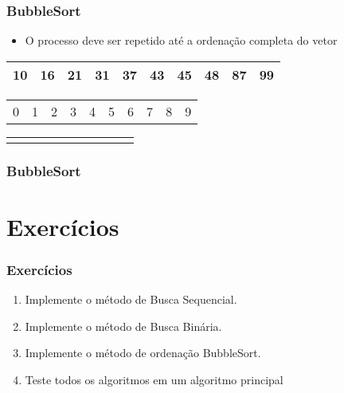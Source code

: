 \documentclass{beamer}
\begin{document}
\begin{frame}
    \frametitle{BubbleSort}
    \begin{itemize}
        \item O processo deve ser repetido até a ordenação completa do vetor
    \end{itemize}
    \begin{center}
        \begin{table}
            \begin{tabular}{| p{0.25cm} | p{0.25cm} | p{0.25cm} | p{0.25cm} | p{0.25cm} | p{0.25cm} | p{0.25cm} | p{0.25cm} | p{0.25cm} | p{0.25cm} |}
                \hline
                10 & 16 & 21 & 31 & 37 & 43 & 45 & 48 & 87 & 99 \\ \hline
            \end{tabular}
            \begin{tabular}{p{0.25cm} p{0.25cm} p{0.25cm} p{0.25cm} p{0.25cm} p{0.25cm} p{0.25cm} p{0.25cm} p{0.25cm} p{0.25cm}}
                0 & 1 & 2 & 3 & 4 & 5 & 6 & 7 & 8 & 9
            \end{tabular}
            \begin{tabular}{p{0.25cm} p{0.25cm} p{0.25cm} p{0.25cm} p{0.25cm} p{0.25cm} p{0.25cm} p{0.25cm} p{0.25cm} p{0.25cm}}
                & & & & & & & & &
            \end{tabular}
        \end{table}
	\end{center}
\end{frame}

\begin{frame}
	\frametitle{BubbleSort}
    \centering
    
\end{frame}

\section{Exercícios}

\begin{frame}
    \frametitle{Exercícios}
    \begin{enumerate}
        \item Implemente o método de Busca Sequencial.
        \item Implemente o método de Busca Binária.
        \item Implemente o método de ordenação BubbleSort.
        \item Teste todos os algoritmos em um algoritmo principal
    \end{enumerate}
\end{frame}
\end{document}
